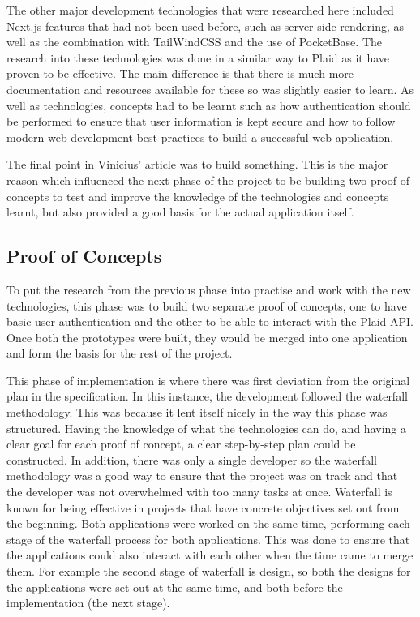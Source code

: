 The other major development technologies that were researched here included Next.js features that had not been used before, such as server side rendering, as well as the combination with TailWindCSS and the use of PocketBase. The research into these technologies was done in a similar way to Plaid as it have proven to be effective. The main difference is that there is much more documentation and resources available for these so was slightly easier to learn. As well as technologies, concepts had to be learnt such as how authentication should be performed to ensure that user information is kept secure and how to follow modern web development best practices to build a successful web application.

The final point in Vinicius' article was to build something. This is the major reason which influenced the next phase of the project to be building two proof of concepts to test and improve the knowledge of the technologies and concepts learnt, but also provided a good basis for the actual application itself.

\subsection{Proof of Concepts}
To put the research from the previous phase into practise and work with the new technologies, this phase was to build two separate proof of concepts, one to have basic user authentication and the other to be able to interact with the Plaid API. Once both the prototypes were built, they would be merged into one application and form the basis for the rest of the project.

This phase of implementation is where there was first deviation from the original plan in the specification. In this instance, the development followed the waterfall methodology. This was because it lent itself nicely in the way this phase was structured. Having the knowledge of what the technologies can do, and having a clear goal for each proof of concept, a clear step-by-step plan could be constructed. In addition, there was only a single developer so the waterfall methodology was a good way to ensure that the project was on track and that the developer was not overwhelmed with too many tasks at once. Waterfall is known for being effective in projects that have concrete objectives set out from the beginning. Both applications were worked on the same time, performing each stage of the waterfall process for both applications. This was done to ensure that the applications could also interact with each other when the time came to merge them. For example the second stage of waterfall is design, so both the designs for the applications were set out at the same time, and both before the implementation (the next stage).

